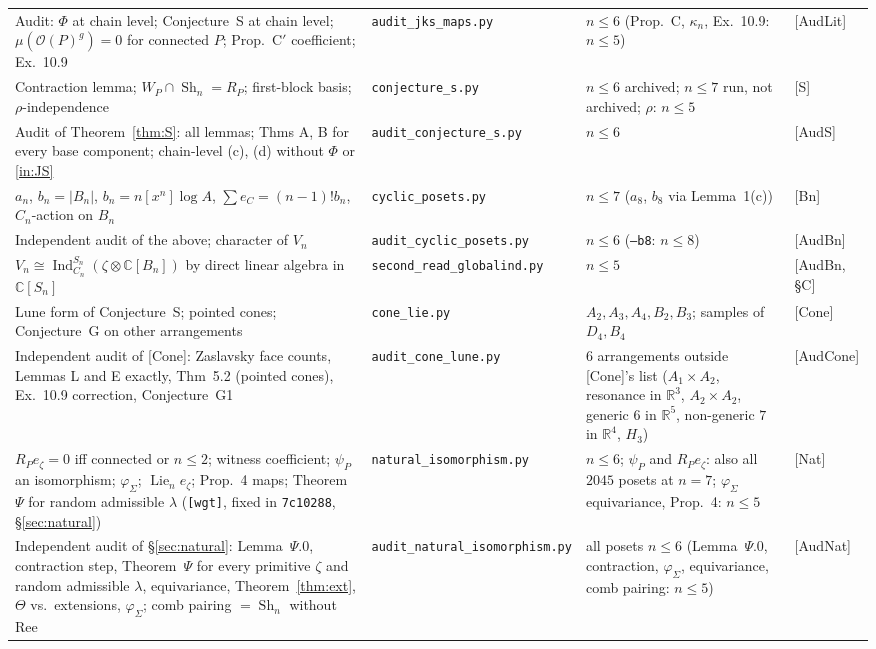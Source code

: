 \documentclass[11pt]{article}
\theoremstyle{definition}
\theoremstyle{remark}
\newcommand{\OP}{\mathcal O}
\newcommand{\Lie}{\operatorname{Lie}}
\newcommand{\Ind}{\operatorname{Ind}}
\newcommand{\Sh}{\operatorname{Sh}}
\newcommand{\src}[1]{\nolinkurl{#1}}
\begin{document}
{\begin{longtable}{>{\raggedright}p{}>{\raggedright}p{}>{\raggedright}p{}p{}}
Audit: $\Phi$ at chain level; Conjecture~S at chain level; $\mu(\OP(P)^g)=0$ for connected $P$; Prop.~C$'$ coefficient; Ex.~10.9 &
\src{audit_jks_maps.py} & $n\le6$ (Prop.~C, $\kappa_n$, Ex.~10.9: $n\le5$) & [AudLit]\\
Contraction lemma; $W_P\cap\Sh_n=R_P$; first-block basis; $\rho$-independence &
\src{conjecture_s.py} & $n\le6$ archived; $n\le7$ run, not archived; $\rho$: $n\le5$ & [S]\\
Audit of Theorem~\ref{thm:S}: all lemmas; Thms A, B for every base component; chain-level (c), (d) without $\Phi$ or \ref{in:JS} &
\src{audit_conjecture_s.py} & $n\le6$ & [AudS]\\
$a_n$, $b_n=|B_n|$, $b_n=n[x^n]\log A$, $\sum e_C=(n-1)!b_n$, $C_n$-action on $B_n$ &
\src{cyclic_posets.py} & $n\le7$ ($a_8$, $b_8$ via Lemma~1(c)) & [Bn]\\
Independent audit of the above; character of $V_n$ &
\src{audit_cyclic_posets.py} & $n\le6$ (\texttt{--b8}: $n\le8$) & [AudBn]\\
$V_n\cong\Ind_{C_n}^{S_n}(\zeta\otimes\mathbb C[B_n])$ by direct linear algebra in $\mathbb C[S_n]$ &
\src{second_read_globalind.py} & $n\le5$ & [AudBn, \S C]\\
Lune form of Conjecture~S; pointed cones; Conjecture~G on other arrangements &
\src{cone_lie.py} & $A_2,A_3,A_4,B_2,B_3$; samples of $D_4,B_4$ & [Cone]\\
Independent audit of [Cone]: Zaslavsky face counts, Lemmas L and E exactly, Thm~5.2 (pointed cones), Ex.~10.9 correction, Conjecture~G1 &
\src{audit_cone_lune.py} & $6$ arrangements outside [Cone]'s list ($A_1\times A_2$, resonance in $\mathbb R^3$, $A_2\times A_2$, generic $6$ in $\mathbb R^5$, non-generic $7$ in $\mathbb R^4$, $H_3$) & [AudCone]\\
$R_Pe_\zeta=0$ iff connected or $n\le2$; witness coefficient; $\psi_P$ an isomorphism; $\varphi_\Sigma$; $\Lie_ne_\zeta$; Prop.~4 maps; Theorem~$\Psi$ for random admissible $\lambda$ (\texttt{[wgt]}, fixed in \texttt{7c10288}, \S\ref{sec:natural}) &
\src{natural_isomorphism.py} & $n\le6$; $\psi_P$ and $R_Pe_\zeta$: also all $2045$ posets at $n=7$; $\varphi_\Sigma$ equivariance, Prop.~4: $n\le5$ & [Nat]\\
Independent audit of \S\ref{sec:natural}: Lemma~$\Psi$.0, contraction step, Theorem~$\Psi$ for every primitive $\zeta$ and random admissible $\lambda$, equivariance, Theorem~\ref{thm:ext}, $\Theta$ vs.\ extensions, $\varphi_\Sigma$; comb pairing $=\Sh_n$ without Ree &
\src{audit_natural_isomorphism.py} & all posets $n\le6$ (Lemma~$\Psi$.0, contraction, $\varphi_\Sigma$, equivariance, comb pairing: $n\le5$) & [AudNat]\\
\end{longtable}
}
\end{document}
